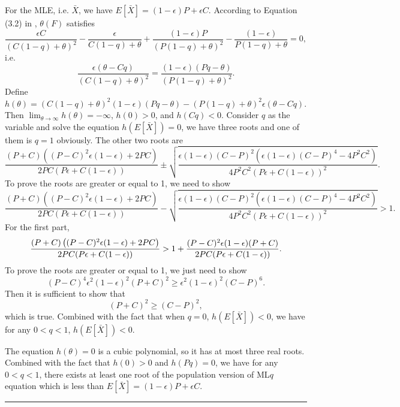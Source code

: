 \documentclass[a4paper]{article}
\newenvironment{proof}{{\bf Proof:  }}{\hfill\rule{2mm}{2mm}}
\begin{document}
\begin{proof}
For the MLE, i.e. $\bar{X}$, we have $E[\bar{X}] = (1-\epsilon) P + \epsilon C$.
According to Equation (3.2) in \citep{ferrari2010}, $\theta(F)$ satisfies
\[
\frac{\epsilon C}{(C(1-q) + \theta)^2} - \frac{\epsilon}{C(1-q) + \theta}
+\frac{(1-\epsilon) P}{(P(1-q) + \theta)^2} - \frac{(1-\epsilon)}{P(1-q) + \theta}
= 0,
\]
i.e.
\[
\frac{\epsilon (\theta - Cq)}{(C(1-q) + \theta)^2} =
\frac{(1-\epsilon) (P q - \theta)}{(P(1-q) + \theta)^2}.
\]
Define $h(\theta) = (C(1-q) + \theta)^2 (1-\epsilon) (P q - \theta) - (P(1-q) + \theta)^2 \epsilon (\theta - Cq)$.
Then $\lim_{\theta \to \infty}h(\theta) = -\infty$, $h(0) > 0$, and $h(Cq) < 0$.
Consider $q$ as the variable and solve the equation $h(E[\bar{X}]) = 0$, we have three roots and one of them is $q = 1$ obviously.
The other two roots are
\[
\frac{(P + C)\left( (P-C)^2 \epsilon(1-\epsilon) + 2PC \right)}{2PC(P \epsilon + C(1-\epsilon))}
\pm \sqrt{\frac{\epsilon(1-\epsilon)(C-P)^2\left(\epsilon(1-\epsilon)(C-P)^4 - 4P^2C^2\right)}{4 P^2 C^2 (P\epsilon + C(1-\epsilon))^2}}.
\]
To prove the roots are greater or equal to 1, we need to show
\[
\frac{(P + C)\left( (P-C)^2 \epsilon(1-\epsilon) + 2PC \right)}{2PC(P \epsilon + C(1-\epsilon))}
- \sqrt{\frac{\epsilon(1-\epsilon)(C-P)^2\left(\epsilon(1-\epsilon)(C-P)^4 - 4P^2C^2\right)}{4 P^2 C^2 (P\epsilon + C(1-\epsilon))^2}} > 1.
\]
For the first part,
\[
\frac{(P + C)\left( (P-C)^2 \epsilon(1-\epsilon) + 2PC \right)}{2PC(P \epsilon + C(1-\epsilon))}\\
> 1 + \frac{(P-C)^2 \epsilon (1-\epsilon) (P+C)}{2PC(P \epsilon + C(1-\epsilon))}.
\]
To prove the roots are greater or equal to 1, we just need to show
\[
(P-C)^4 \epsilon^2 (1-\epsilon)^2 (P+C)^2 \ge \epsilon^2(1-\epsilon)^2(C-P)^6.
\]
Then it is sufficient to show that
\[
(P+C)^2 \ge (C-P)^2,
\]
which is true.
Combined with the fact that when $q = 0$, $h(E[\bar{X}]) < 0$, we have for any $0 < q < 1$, $h(E[\bar{X}]) < 0$.

The equation $h(\theta) = 0$ is a cubic polynomial, so it has at most three real roots. Combined with the fact that $h(0) > 0$ and $h(P q) = 0$, we have for any $0 < q < 1$, there exists at least one root of the population version of ML$q$ equation which is less than $E[\bar{X}] = (1-\epsilon)P + \epsilon C$.
\end{proof}
\end{document}
